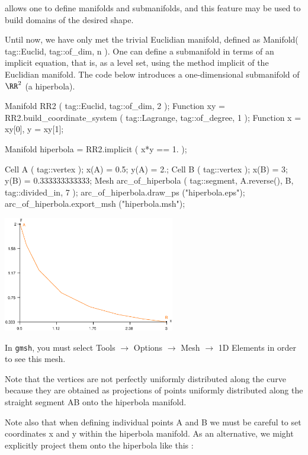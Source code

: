 {\ManiFEM} allows one to define manifolds and submanifolds, and this feature may be
used to build domains of the desired shape.

Until now, we have only met the trivial Euclidian manifold, defined as {\codett
Manifold\break ( tag::Euclid, tag::of\_dim, n )}.
One can define a submanifold in terms of an implicit equation, that is, as a level set,
using the method {\codett implicit} of the Euclidian manifold.
The code below introduces a one-dimensional submanifold of $ \RR^2 $ (a hiperbola).

\verbatim
   Manifold RR2 ( tag::Euclid, tag::of_dim, 2 );
   Function xy = RR2.build_coordinate_system ( tag::Lagrange, tag::of_degree, 1 );
   Function x = xy[0],  y = xy[1];
   
   Manifold hiperbola = RR2.implicit ( x*y == 1. );
   
   Cell A ( tag::vertex );  x(A) =  0.5;   y(A) =  2.;
   Cell B ( tag::vertex );  x(B) =  3;     y(B) =  0.333333333333;
   Mesh arc_of_hiperbola ( tag::segment, A.reverse(), B, tag::divided_in, 7 );
   arc_of_hiperbola.draw_ps ("hiperbola.eps");
   arc_of_hiperbola.export_msh ("hiperbola.msh");
\endverbatim

{ 
\centerline{\includegraphics[width=75mm]{hiperbola.eps}} }

In {\tt gmsh}, you must select {\codett Tools} $\to$ {\codett Options} $\to$
{\codett Mesh} $\to$ {\codett 1D Elements} in order to see this mesh.

Note that the vertices are not perfectly uniformly distributed along the curve
because they are obtained as projections of points uniformly distributed along
the straight segment {\codett AB} onto the {\codett hiperbola} manifold.

Note also that when defining individual points {\codett A} and {\codett B} we must be careful
to set coordinates {\codett x} and {\codett y} within the {\codett hiperbola} manifold.
As an alternative, we might explicitly project them onto the {\codett hiperbola} like this :

